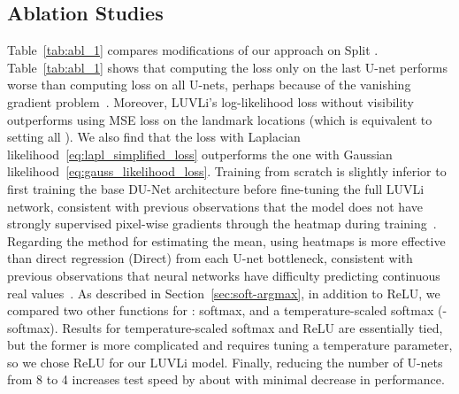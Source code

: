 \documentclass[10pt,twocolumn,letterpaper]{article}
\newcommand{\1}{{\bf 1}}
\newcommand{\0}{{\bf 0}}
\begin{document}
\subsection{Ablation Studies}\label{sec:results_ablation}
    \vspace{-0.2cm}
    Table~\ref{tab:abl_1} compares modifications of our approach on Split . Table~\ref{tab:abl_1} shows that computing the loss only on the last U-net performs worse than computing loss on all U-nets, perhaps because of the vanishing gradient problem~\cite{wei2016convolutional}. Moreover, LUVLi's log-likelihood loss without visibility outperforms using MSE loss on the landmark locations (which is equivalent to setting all ). We also find that the loss with Laplacian likelihood~\eqref{eq:lapl_simplified_loss} outperforms the one with Gaussian likelihood~\eqref{eq:gauss_likelihood_loss}. Training from scratch is slightly inferior to first training the base DU-Net architecture before fine-tuning the full LUVLi network, consistent with previous observations that the model does not have strongly supervised pixel-wise gradients through the heatmap during training~\cite{nibali2018numerical}. Regarding the method for estimating the mean, using heatmaps is more effective than direct regression (Direct) from each U-net bottleneck, consistent with previous observations that neural networks have difficulty predicting continuous real values~\cite{Belagiannis17, nibali2018numerical}. As described in Section~\ref{sec:soft-argmax}, in addition to ReLU, we compared two other functions for : softmax, and a temperature-scaled softmax (-softmax). Results for temperature-scaled softmax and ReLU are essentially tied, but the former is more complicated and requires tuning a temperature parameter, so we chose ReLU for our LUVLi model. Finally, reducing the number of U-nets from 8 to 4 increases test speed by about  with minimal decrease in performance.
\end{document}
